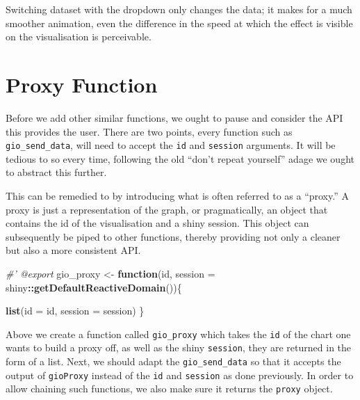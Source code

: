 \documentclass[10pt,]{krantz}
\makeatletter
\newenvironment{Shaded}{\begin{snugshade}}{\end{snugshade}}
\newcommand{\CommentTok}[1]{\textcolor[rgb]{0.37,0.37,0.37}{\textit{#1}}}
\newcommand{\ControlFlowTok}[1]{\textcolor[rgb]{0.27,0.27,0.27}{\textbf{#1}}}
\newcommand{\DataTypeTok}[1]{\textcolor[rgb]{0.27,0.27,0.27}{#1}}
\newcommand{\DecValTok}[1]{\textcolor[rgb]{0.06,0.06,0.06}{#1}}
\newcommand{\KeywordTok}[1]{\textcolor[rgb]{0.27,0.27,0.27}{\textbf{#1}}}
\newcommand{\NormalTok}[1]{#1}
\newcommand{\OperatorTok}[1]{\textcolor[rgb]{0.43,0.43,0.43}{\textbf{#1}}}
\newcommand{\StringTok}[1]{\textcolor[rgb]{0.5,0.5,0.5}{#1}}
\newenvironment{kframe}{%
\medskip{}
\setlength{\fboxsep}{.8em}
 \def\at@end@of@kframe{}%
 \ifinner\ifhmode%
  \def\at@end@of@kframe{\end{minipage}}%
  \begin{minipage}{\columnwidth}%
 \fi\fi%
 \def\FrameCommand##1{\hskip\@totalleftmargin \hskip-\fboxsep
 \colorbox{shadecolor}{##1}\hskip-\fboxsep
     \hskip-\linewidth \hskip-\@totalleftmargin \hskip\columnwidth}%
 \MakeFramed {\advance\hsize-\width
   \@totalleftmargin\z@ \linewidth\hsize
   \@setminipage}}%
 {\par\unskip\endMakeFramed%
 \at@end@of@kframe}
\renewenvironment{Shaded}{\begin{kframe}}{\end{kframe}}
\makeatother
\begin{document}
Switching dataset with the dropdown only changes the data; it makes for a much smoother animation, even the difference in the speed at which the effect is visible on the visualisation is perceivable.

\hypertarget{shiny-widgets-proxy}{%
\section{Proxy Function}\label{shiny-widgets-proxy}}

Before we add other similar functions, we ought to pause and consider the API this provides the user. There are two points, every function such as \texttt{gio\_send\_data}, will need to accept the \texttt{id} and \texttt{session} arguments. It will be tedious to so every time, following the old ``don't repeat yourself'' adage we ought to abstract this further.

This can be remedied to by introducing what is often referred to as a ``proxy.'' A proxy is just a representation of the graph, or pragmatically, an object that contains the id of the visualisation and a shiny session. This object can subsequently be piped to other functions, thereby providing not only a cleaner but also a more consistent API.

\begin{Shaded}
\begin{Highlighting}[]
\CommentTok{#' @export}
\NormalTok{gio_proxy <-}\StringTok{ }\ControlFlowTok{function}\NormalTok{(id, }
  \DataTypeTok{session =}\NormalTok{ shiny}\OperatorTok{::}\KeywordTok{getDefaultReactiveDomain}\NormalTok{())\{}

  \KeywordTok{list}\NormalTok{(}\DataTypeTok{id =}\NormalTok{ id, }\DataTypeTok{session =}\NormalTok{ session)}
\NormalTok{\}}
\end{Highlighting}
\end{Shaded}

Above we create a function called \texttt{gio\_proxy} which takes the \texttt{id} of the chart one wants to build a proxy off, as well as the shiny \texttt{session}, they are returned in the form of a list. Next, we should adapt the \texttt{gio\_send\_data} so that it accepts the output of \texttt{gioProxy} instead of the \texttt{id} and \texttt{session} as done previously. In order to allow chaining such functions, we also make sure it returns the \texttt{proxy} object.

\begin{Shaded}
\end{Shaded}
\end{document}
